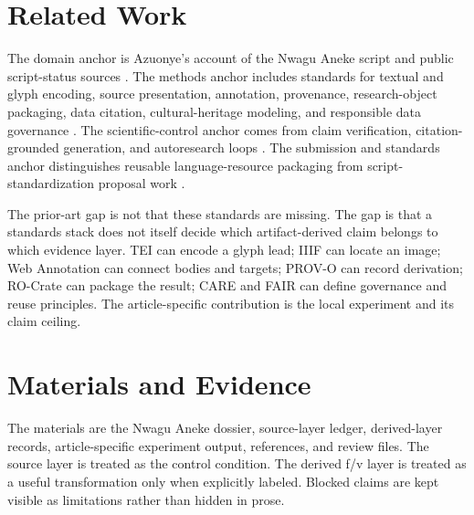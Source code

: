 \documentclass[sigconf,nonacm]{acmart}
\begin{document}
\section{Related Work}
The domain anchor is Azuonye's account of the Nwagu Aneke script and public
script-status sources \cite{azuonye1992,omniglotNwagu,unicodeAfricanScripts2023,scriptSourceNwagu,sirisNwaguProposal}.
The methods anchor includes standards for textual and glyph encoding, source
presentation, annotation, provenance, research-object packaging, data citation,
cultural-heritage modeling, and responsible data governance \cite{azuonye1992,omniglotNwagu,unicodeAfricanScripts2023,scriptSourceNwagu,sirisNwaguProposal,teiP5Glyphs,iiifPresentation3,w3cAnnotationModel,w3cAnnotationVocab,w3cProvO,rocrate12,cidocCrm,datacite45,wilkinson2016fair,carroll2020care,wadden2020scifact,gao2023alce,karpathyAutoresearch,acmSubmissions,arxivSubmitTex}.
The scientific-control anchor comes from claim verification, citation-grounded
generation, and autoresearch loops \cite{wadden2020scifact,gao2023alce,karpathyAutoresearch}.
The submission and standards anchor distinguishes reusable language-resource
packaging from script-standardization proposal work \cite{arxivTexLive,seiProposalTips}.

The prior-art gap is not that these standards are missing. The gap is that a
standards stack does not itself decide which artifact-derived claim belongs to
which evidence layer. TEI can encode a glyph lead; IIIF can locate an image;
Web Annotation can connect bodies and targets; PROV-O can record derivation;
RO-Crate can package the result; CARE and FAIR can define governance and reuse
principles. The article-specific contribution is the local experiment and its
claim ceiling.

\section{Materials and Evidence}
The materials are the Nwagu Aneke dossier, source-layer ledger, derived-layer
records, article-specific experiment output, references, and review files.
The source layer is treated as the control condition. The derived f/v layer is
treated as a useful transformation only when explicitly labeled. Blocked claims
are kept visible as limitations rather than hidden in prose.
\end{document}
